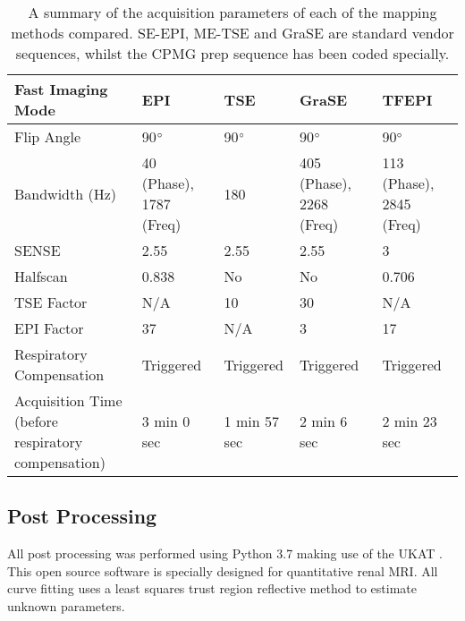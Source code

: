 \begin{table}[H]
\begin{adjustbox}{width=1.0\textwidth, center}
\begin{tabularx}{1.25\textwidth}{X|X|X|X|X}
		Fast   Imaging Mode                                  & EPI                             & TSE                        & GraSE              & TFEPI               \\ \hline
		Flip Angle                                           & 90$\degree$                     & 90$\degree$                & 90$\degree$        & 90$\degree$         \\ \hline
		Bandwidth   (Hz)                                     & 40 (Phase), 1787 (Freq)         & 180                        & 405 (Phase), 2268 (Freq) & 113 (Phase), 2845 (Freq)\\ \hline
		SENSE                                                & 2.55                            & 2.55                       & 2.55               & 3                   \\ \hline
		Halfscan                                             & 0.838                           & No                         & No                 & 0.706               \\ \hline
		TSE Factor                                           & N/A                             & 10                         & 30                 & N/A                 \\ \hline
		EPI Factor                                           & 37                              & N/A                        & 3                  & 17                  \\ \hline
		Respiratory Compensation                             & Triggered                       & Triggered                  & Triggered          & Triggered           \\ \hline
		Acquisition Time \scriptsize{(before respiratory compensation)} & 3 min 0 sec                & 1 min 57 sec               & 2 min 6 sec        & 2 min 23 sec  
	\end{tabularx}
	\end{adjustbox}
	\caption{A summary of the acquisition parameters of each of the \ttwo mapping methods compared. \ac{SE}-\ac{EPI}, \ac{ME-TSE} and \ac{GraSE} are standard vendor sequences, whilst the \ac{CPMG} \ttwo prep sequence has been coded specially.}
	\label{tab:t2_sequence_overview}
\end{table}

\subsection{Post Processing}

All post processing was performed using Python 3.7 making use of the \ac{UKAT} \cite{daniel_ukrin_2021, nery_ukrin_2020}. This open source software is specially designed for quantitative renal \ac{MRI}. All curve fitting uses a least squares trust region reflective method to estimate unknown parameters.

